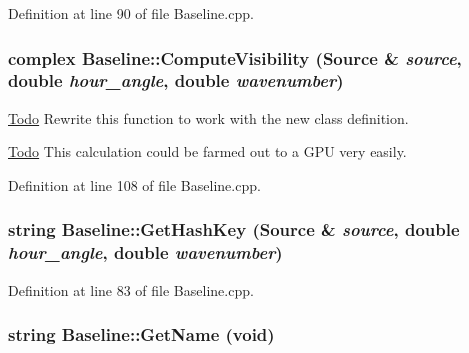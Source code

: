 Definition at line 90 of file Baseline.cpp.

\hypertarget{classBaseline_af5d2d827062aae6eaff5440c60d3d0b4}{
\subsubsection[{ComputeVisibility}]{\setlength{\rightskip}{0pt plus 5cm}complex Baseline::ComputeVisibility ({\bf Source} \& {\em source}, \/  double {\em hour\_\-angle}, \/  double {\em wavenumber})}}
\label{classBaseline_af5d2d827062aae6eaff5440c60d3d0b4}
\begin{Desc}
\item[\hyperlink{todo__todo000009}{Todo}]Rewrite this function to work with the new class definition. \end{Desc}


\begin{Desc}
\item[\hyperlink{todo__todo000007}{Todo}]This calculation could be farmed out to a GPU very easily. \end{Desc}




Definition at line 108 of file Baseline.cpp.

\hypertarget{classBaseline_a78f552de0293445a1e1a06a465f4aaf7}{
\subsubsection[{GetHashKey}]{\setlength{\rightskip}{0pt plus 5cm}string Baseline::GetHashKey ({\bf Source} \& {\em source}, \/  double {\em hour\_\-angle}, \/  double {\em wavenumber})}}
\label{classBaseline_a78f552de0293445a1e1a06a465f4aaf7}


Definition at line 83 of file Baseline.cpp.

\hypertarget{classBaseline_ad12e1939189ed6b413f9fb691eeb7ff0}{
\subsubsection[{GetName}]{\setlength{\rightskip}{0pt plus 5cm}string Baseline::GetName (void)}}
\label{classBaseline_ad12e1939189ed6b413f9fb691eeb7ff0}


